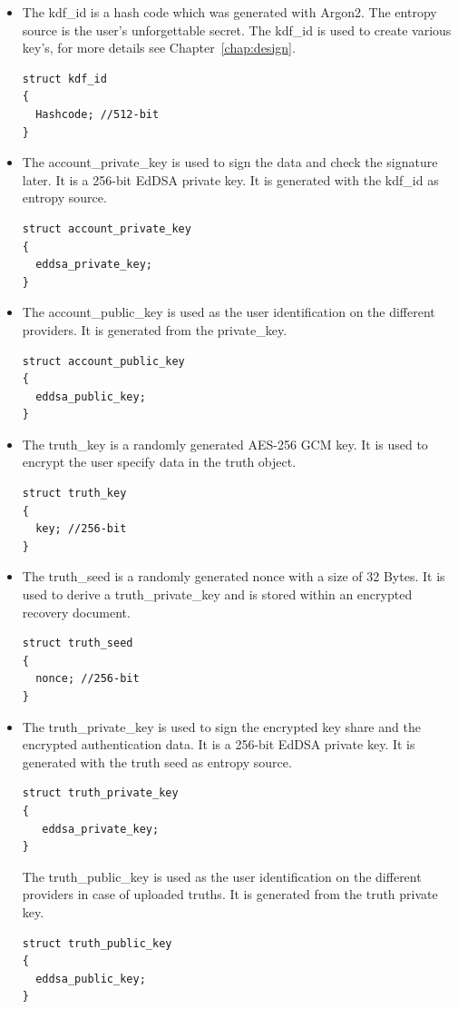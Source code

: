 \begin{itemize}
  \item
The kdf\_id is a hash code which was generated with Argon2. The
entropy source is the user's unforgettable secret. The kdf\_id is used
to create various key's, for more details see Chapter~\ref{chap:design}.

\begin{lstlisting}
struct kdf_id
{
  Hashcode; //512-bit
}
\end{lstlisting}

\item
The account\_private\_key is used to sign the data and check the signature later. It is a 256-bit EdDSA private key. It is generated with the kdf\_id as entropy source.
\begin{lstlisting}
struct account_private_key
{
  eddsa_private_key;
}
\end{lstlisting}

\item
The account\_public\_key is used as the user identification on the different providers. It is generated from the private\_key.
\begin{lstlisting}
struct account_public_key
{
  eddsa_public_key;
}
\end{lstlisting}

\item
The truth\_key is a randomly generated AES-256 GCM key. It is used to encrypt the user specify data in the truth object.
\begin{lstlisting}
struct truth_key
{
  key; //256-bit
}
\end{lstlisting}

\item
The truth\_seed is a randomly generated nonce with a size of 32 Bytes. It is used to derive a truth\_private\_key
and is stored within an encrypted recovery document.
\begin{lstlisting}
struct truth_seed
{
  nonce; //256-bit
}
\end{lstlisting}

\item
The truth\_private\_key is used to sign the encrypted key share and the encrypted authentication data. It is a 256-bit EdDSA private key. It is generated with the truth seed as entropy source.
\begin{lstlisting}
struct truth_private_key
{
   eddsa_private_key;
}
\end{lstlisting}

The truth\_public\_key is used as the user identification on the different providers in case of uploaded truths. It is generated from the truth private key.
 \begin{lstlisting}
struct truth_public_key
{
  eddsa_public_key;
}
\end{lstlisting}



\end{itemize}
